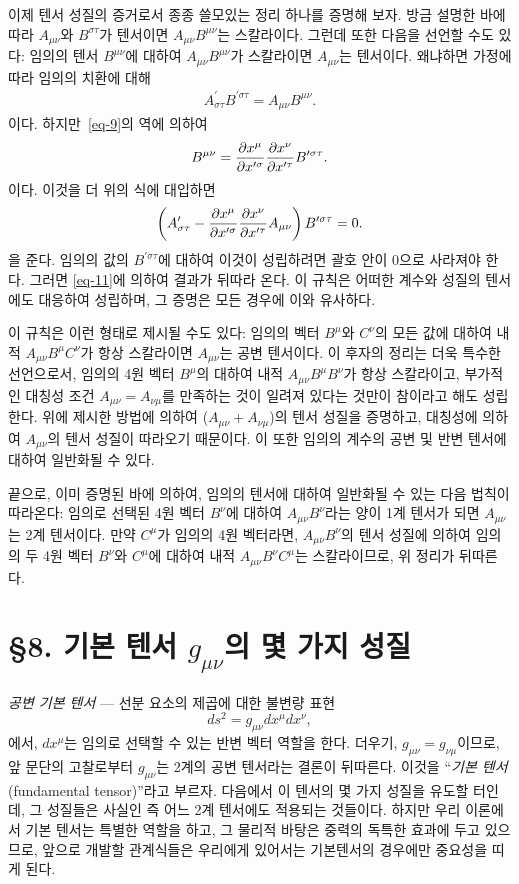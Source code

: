 \documentclass[b5paper]{article}
\begin{document}
이제 텐서 성질의 증거로서 종종 쓸모있는 정리 하나를 증명해 보자. 방금 설명한 바에 따라 
$A_{\mu\nu}$와 $B^{\sigma\tau}$가 텐서이면 $A_{\mu\nu}B^{\mu\nu}$는 스칼라이다. 그런데 또한 다음을 선언할 수도 있다: 임의의 텐서 $B^{\mu\nu}$에 대하여  $A_{\mu\nu}B^{\mu\nu}$가 스칼라이면 $A_{\mu\nu}$는 텐서이다. 왜냐하면 가정에 따라 임의의 치환에 대해
\begin{align*}
	A_{\sigma\tau}^\prime B^{\prime\sigma\tau}=A_{\mu\nu}B^{\mu\nu}.
\end{align*}이다.
하지만~\eqref{eq-9}의 역에 의하여
\begin{equation*}
	B^{\mu\nu}={\frac{{\partial}{x^\mu}}{{\partial}{x^{\prime\sigma}}}}{\frac{{\partial}{x^\nu}}{{\partial}{x^{\prime\tau}}}} B^{\prime\sigma\tau}.
\end{equation*}이다. 이것을 더 위의 식에 대입하면
\begin{equation*}
\left(A_{\sigma\tau}^\prime - {\frac{{\partial}{x^\mu}}{{\partial}{x^{\prime\sigma}}}}{\frac{{\partial}{x^\nu}}{{\partial}{x^{\prime\tau}}}} A_{\mu\nu} \right) B^{\prime\sigma\tau}=0.
\end{equation*}을 준다. 임의의 값의 $B^{\prime\sigma\tau}$에 대하여 이것이 성립하려면 괄호 안이 0으로 사라져야 한다.
그러면 \eqref{eq-11}에 의하여 결과가 뒤따라 온다. 이 규칙은 어떠한 계수와 성질의 텐서에도 대응하여 성립하며, 그 증명은 모든 경우에 이와 유사하다.

이 규칙은 이런 형태로 제시될 수도 있다: 
임의의 벡터 $B^{\mu}$와 $C^\nu$의 모든 값에 대하여 내적 $A_{\mu\nu} B^\mu C^\nu$가 항상 스칼라이면 $A_{\mu\nu}$는 공변 텐서이다. 이 후자의 정리는 더욱 특수한 선언으로서, 임의의 4원 벡터 $B^\mu$의 대하여 내적 $A_{\mu\nu} B^\mu B^\nu$가 항상 스칼라이고, 부가적인 대칭성 조건 $A_{\mu\nu}=A_{\nu\mu}$를 만족하는 것이 일려져 있다는 것만이 참이라고 해도 성립한다. 위에 제시한 방법에 의하여 ($A_{\mu\nu}+A_{\nu\mu}$)의 텐서 성질을 증명하고, 대칭성에 의하여 $A_{\mu\nu}$의 텐서 성질이 따라오기 때문이다. 이 또한 임의의 계수의 공변 및 반변 텐서에 대하여 일반화될 수 있다.

끝으로, 이미 증명된 바에 의하여, 임의의 텐서에 대하여 일반화될 수 있는 다음 법칙이 따라온다: 임의로 선택된 4원 벡터 $B^\nu$에 대하여 $A_{\mu\nu} B^\nu$라는 양이 1계 텐서가 되면 $A_{\mu\nu}$는 2계 텐서이다. 만약 $C^\mu$가 임의의 4원 벡터라면, $A_{\mu\nu} B^\nu$의 텐서 성질에 의하여 임의의 두 4원 벡터 $B^\nu$와 $C^\mu$에 대하여 내적 $A_{\mu\nu} B^\nu C^\mu$는 스칼라이므로, 위 정리가 뒤따른다. 

\section*{\S 8. 기본 텐서 $g_{\mu\nu}$의 몇 가지 성질}
\emph{공변 기본 텐서} --- 
선분 요소의 제곱에 대한 불변량 표현 
\[ds^2 = g_{\mu\nu}dx^\mu dx^\nu ,\]
에서, $dx^\mu$는 임의로 선택할 수 있는 반변 벡터 역할을 한다. 더우기, $g_{\mu\nu}=g_{\nu\mu}$이므로, 앞 문단의 고찰로부터 $g_{\mu\nu}$는 2계의 공변 텐서라는 결론이 뒤따른다.  이것을 ``\emph{기본 텐서}(fundamental tensor)''라고 부르자. 다음에서 이 텐서의 몇 가지 성질을 유도할 터인데, 그 성질들은 사실인 즉 어느 2계 텐서에도 적용되는 것들이다. 하지만 우리 이론에서 기본 텐서는 특별한 역할을 하고, 그 물리적 바탕은 중력의 독특한 효과에 두고 있으므로, 앞으로 개발할 관계식들은 우리에게 있어서는 기본텐서의 경우에만 중요성을 띠게 된다.
\end{document}
